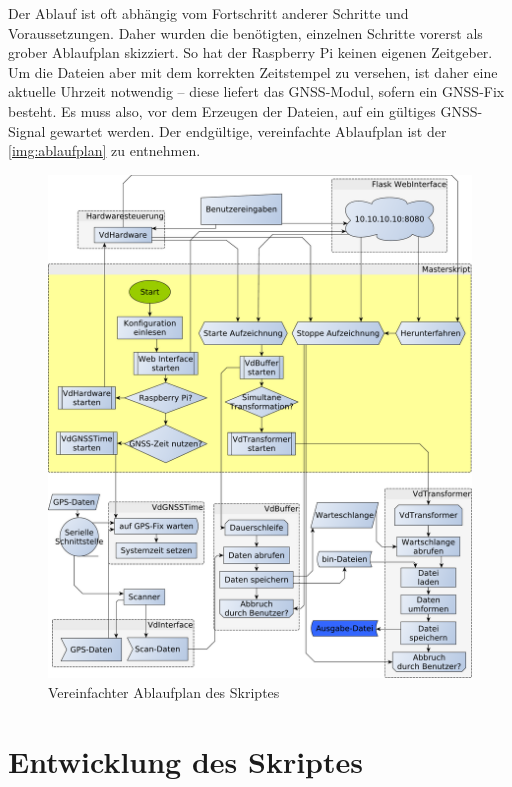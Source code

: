\documentclass[a4paper,12pt,bibliography=totoc, listof=totoc,titlepage,pointlessnumbers]{scrreprt}
\begin{document}
Der Ablauf ist oft abhängig vom Fortschritt anderer Schritte und Voraussetzungen. Daher wurden die benötigten, einzelnen Schritte vorerst als grober Ablaufplan skizziert. So hat der Rasp\-berry Pi keinen eigenen Zeitgeber. Um die Dateien aber mit dem korrekten Zeitstempel zu versehen, ist daher eine aktuelle Uhrzeit notwendig -- diese liefert das GNSS-Modul, sofern ein GNSS-Fix besteht. Es muss also, vor dem Erzeugen der Dateien, auf ein gültiges GNSS-Signal gewartet werden. Der endgültige, vereinfachte Ablaufplan ist der \autoref{img:ablaufplan} zu entnehmen. 
\begin{figure}[!ht]
 \centering
 \includegraphics[width=1\textwidth]{./img/ablaufplan.pdf}
 \caption{Vereinfachter Ablaufplan des Skriptes}
 \label{img:ablaufplan}
\end{figure}

\chapter{Entwicklung des Skriptes}
\label{c:skript}
\end{document}
